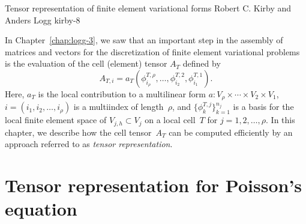               {Tensor representation of finite element variational forms}
              {Robert C. Kirby and Anders Logg}
              {kirby-8}

In Chapter~\ref{chap:logg-3}, we saw that an important step in the
assembly of matrices and vectors for the discretization of finite
element variational problems is the evaluation of the cell (element)
tensor $A_T$ defined by
\begin{equation*}
  A_{T,i}
  = a_T(\phi^{T,\rho}_{i_{\rho}}, \ldots, \phi^{T,2}_{i_2}, \phi^{T,1}_{i_1}).
\end{equation*}
Here, $a_T$ is the local contribution to a multilinear form $a:
V_{\rho} \times \cdots \times V_2 \times V_1$,
$i=(i_1,i_2,\dots,i_\rho)$ is a multiindex of length~$\rho$, and
$\{\phi^{T,j}_k\}_{k=1}^{n_j}$ is a basis for the local finite element
space of $V_{j,h} \subset V_j$ on a local cell~$T$ for $j =
1,2,\ldots,\rho$. In this chapter, we describe how the cell
tensor~$A_T$ can be computed efficiently by an approach referred to as
\emph{tensor representation}.

\section{Tensor representation for Poisson's equation}


